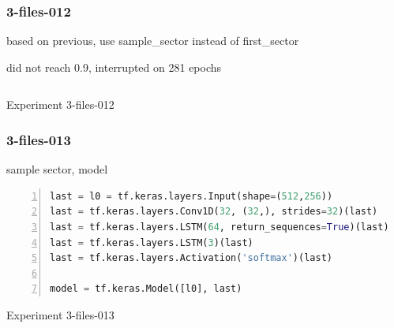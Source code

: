 % 
\subsubsection{3-files-012}

based on previous, use sample\_sector instead of first\_sector

did not reach 0.9, interrupted on 281 epochs



\noindent
\begin{algorithm}
\begin{lstlisting}[language=Python, frame=single, numbers=left]
\end{lstlisting}
\caption{\label{alg:3-files-012}Experiment 3-files-012}
\end{algorithm}


\subsubsection{3-files-013}

sample sector, model




\noindent
\begin{algorithm}
\begin{lstlisting}[language=Python, frame=single, numbers=left]
last = l0 = tf.keras.layers.Input(shape=(512,256))
last = tf.keras.layers.Conv1D(32, (32,), strides=32)(last)
last = tf.keras.layers.LSTM(64, return_sequences=True)(last)
last = tf.keras.layers.LSTM(3)(last)
last = tf.keras.layers.Activation('softmax')(last)

model = tf.keras.Model([l0], last)
\end{lstlisting}
\caption{\label{alg:3-files-013}Experiment 3-files-013}
\end{algorithm}

